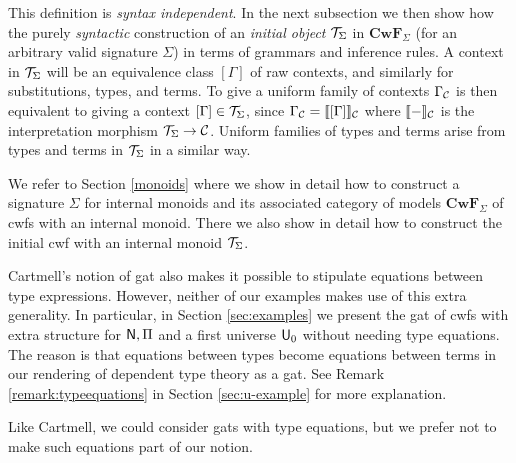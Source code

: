 \documentclass{lmcs}
\def\Cwf{\mathbf{CwF}}
\begin{document}
This definition is {\em syntax independent}. In the next subsection we then show how the purely {\em syntactic} construction of an {\em initial object} ${\mathcal T}_{\Sigma}$ in $\Cwf_{\Sigma}$ (for an arbitrary valid signature $\Sigma$) in terms of grammars and inference rules. A context in ${\mathcal T}_{\Sigma}$ will be an equivalence class $[ \Gamma ]$ of raw contexts, and similarly for substitutions, types, and terms. To give a uniform
  family of contexts $\Gamma_{\mathcal C}$ is then equivalent to giving a context $[ \Gamma ] \in {\mathcal T}_{\Sigma}$, since $\Gamma_{\mathcal C} = \llbracket  [ \Gamma ]  \rrbracket_{\mathcal C}$ where $\llbracket - \rrbracket_{\mathcal C}$ is the interpretation morphism ${\mathcal T}_\Sigma \to {\mathcal C}$.
Uniform families of types and terms arise from types and terms in ${\mathcal T}_\Sigma$ in a similar way.

We refer to Section \ref{monoids} where we show in detail how to construct a signature $\Sigma$ for internal monoids and its associated category of models $\Cwf_\Sigma$ of cwfs with an internal monoid. There we also show in detail how to construct the initial cwf with an internal monoid ${\mathcal T}_\Sigma$. 

\begin{remark}
Cartmell's notion of gat \cite{cartmell:phd,cartmell:apal} also makes it possible to stipulate equations between type expressions. However, neither of our examples makes use of this extra generality. In particular,  in Section \ref{sec:examples} we present the gat of cwfs with extra structure for $\mathsf{N}, \Pi$ and a first universe $\mathsf{U}_0$ without needing type equations. The reason is that
equations between types become equations between terms in our rendering
of dependent type theory as a gat. See Remark \ref{remark:typeequations} in Section \ref{sec:u-example} for more explanation.

Like Cartmell, we could consider gats with type equations, but we prefer not to make such equations part of our notion.


\end{remark}
\end{document}
